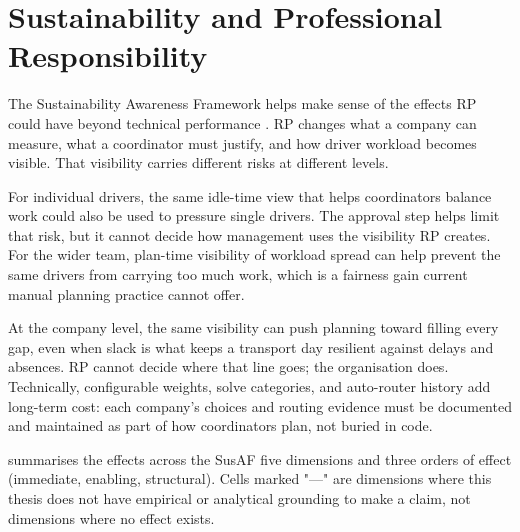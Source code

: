 \section{Sustainability and Professional Responsibility}
\label{sec:sustainability}
\label{sec:profession-ethics}

The Sustainability Awareness Framework helps make sense of the effects RP could have beyond technical performance \parencite{becker2015karlskrona,duboc2020requirements}. RP changes what a company can measure, what a coordinator must justify, and how driver workload becomes visible. That visibility carries different risks at different levels.

For individual drivers, the same idle-time view that helps coordinators balance work could also be used to pressure single drivers. The approval step helps limit that risk, but it cannot decide how management uses the visibility RP creates. For the wider team, plan-time visibility of workload spread can help prevent the same drivers from carrying too much work, which is a fairness gain current manual planning practice cannot offer.

At the company level, the same visibility can push planning toward filling every gap, even when slack is what keeps a transport day resilient against delays and absences. RP cannot decide where that line goes; the organisation does. Technically, configurable weights, solve categories, and auto-router history add long-term cost: each company's choices and routing evidence must be documented and maintained as part of how coordinators plan, not buried in code.

 summarises the effects across the SusAF five dimensions and three orders of effect (immediate, enabling, structural). Cells marked "---" are dimensions where this thesis does not have empirical or analytical grounding to make a claim, not dimensions where no effect exists.

